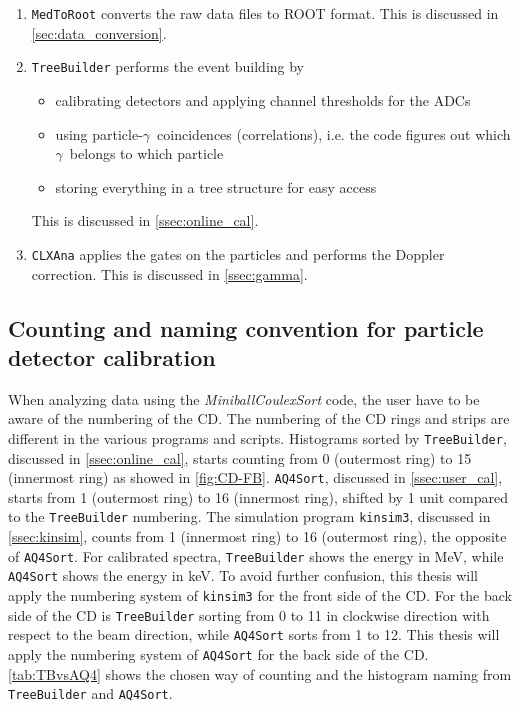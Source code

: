 \documentclass[twoside,english]{uiofysmaster/uiofysmaster}
\newcommand{\ga}{$\gamma$}
\let\orgautoref\autoref
\renewcommand{\autoref}
        {%
		 \def\sectionautorefname{Section}%
		 \def\subsectionautorefname{Section}%
		 \def\subsubsectionautorefname{Section}%
		 \def\chapterautorefname{Chapter}%
          \orgautoref}
\begin{document}
\begin{enumerate}
	\item \texttt{MedToRoot} converts the raw data files to ROOT format. This is discussed in  \autoref{sec:data_conversion}.
	\item \texttt{TreeBuilder} performs the event building by
		\begin{itemize}
			\item calibrating detectors and applying channel thresholds for the ADCs
			\item using particle-\ga\ coincidences (correlations), i.e. the code figures out which \ga\ belongs to which particle
			\item storing everything in a tree structure for easy access
		\end{itemize}
		This is discussed in \autoref{ssec:online_cal}.
	\item \texttt{CLXAna} applies the gates on the particles and performs the Doppler correction. This is discussed in \autoref{ssec:gamma}.
\end{enumerate}


\subsection{Counting and naming convention for particle detector calibration}
When analyzing data using the \textsl{MiniballCoulexSort} code, the user have to be aware of the numbering of the CD.
The numbering of the CD rings and strips are different in the various programs and scripts. 
Histograms sorted by \texttt{TreeBuilder}, discussed in \autoref{ssec:online_cal}, starts counting from 0 (outermost ring) to 15 (innermost ring) as showed in \autoref{fig:CD-FB}. 
\texttt{AQ4Sort}, discussed in \autoref{ssec:user_cal}, starts from 1 (outermost ring) to 16 (innermost ring), shifted by 1 unit compared to the \texttt{TreeBuilder} numbering.
The simulation program \texttt{kinsim3}, discussed in \autoref{ssec:kinsim}, counts from 1 (innermost ring) to 16 (outermost ring), the opposite of \texttt{AQ4Sort}. 
For calibrated spectra, \texttt{TreeBuilder} shows the energy in MeV, while \texttt{AQ4Sort} shows the energy in keV.
To avoid further confusion, this thesis will apply the numbering system of \texttt{kinsim3} for the front side of the CD.
For the back side of the CD is \texttt{TreeBuilder} sorting from 0 to 11 in clockwise direction with respect to the beam direction, while \texttt{AQ4Sort} sorts from 1 to 12.
This thesis will apply the numbering system of \texttt{AQ4Sort} for the back side of the CD.
\autoref{tab:TBvsAQ4} shows the chosen way of counting and the histogram naming from \texttt{TreeBuilder} and \texttt{AQ4Sort}.
\end{document}
